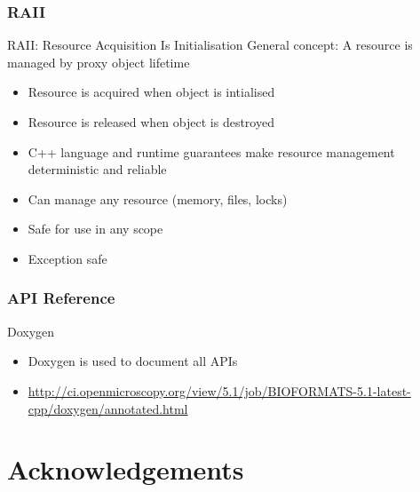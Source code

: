 \documentclass{beamer}
\begin{document}
\begin{frame}[fragile]
  \frametitle{RAII}
\begin{block}{RAII: Resource Acquisition Is Initialisation}
General concept: A resource is managed by proxy object lifetime
  \begin{itemize}
    \item Resource is acquired when object is intialised
    \item Resource is released when object is destroyed
    \item C++ language and runtime guarantees make resource management
      deterministic and reliable
    \item Can manage any resource (memory, files, locks)
    \item Safe for use in any scope
    \item Exception safe
  \end{itemize}
\end{block}
\end{frame}

\begin{frame}[fragile]
  \frametitle{API Reference}
\begin{block}{Doxygen}
  \begin{itemize}
  \item Doxygen is used to document all APIs
    \item \url{http://ci.openmicroscopy.org/view/5.1/job/BIOFORMATS-5.1-latest-cpp/doxygen/annotated.html}
  \end{itemize}
\end{block}
\end{frame}

\section{Acknowledgements}
\end{document}
